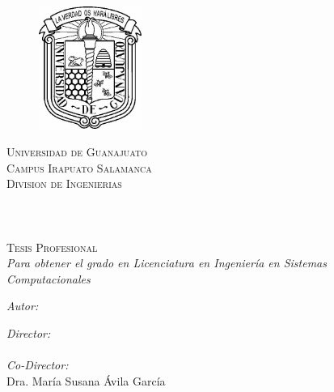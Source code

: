 \documentclass[11pt, oneside, a4paper]{Thesis} %
\begin{document}
\begin{titlepage}
\begin{center}

\begin{figure}[htbp]
	\centering
		\includegraphics[width=0.30\textwidth]{Figures/uni.jpg}
\end{figure}

\textsc{\LARGE Universidad de Guanajuato}\\[0.5cm] %
\textsc{\Large Campus Irapuato Salamanca }\\
\textsc{\Large Division de Ingenierias } \\[1.5cm]


\HRule \\[0.4cm] %
{\huge \bfseries \ttitle}\\[0.4cm] %
\HRule \\[1.1cm] %

\textsc{\Large Tesis Profesional }\\
\large \textit{Para obtener el grado en Licenciatura en Ingeniería en Sistemas Computacionales}\\[1.0cm] %


\begin{minipage}{0.4\textwidth}
\begin{flushleft} \large
\emph{Autor:}\\
{\authornames} %
\end{flushleft}
\end{minipage}
\begin{minipage}{0.4\textwidth}
\begin{flushright} \large
\emph{Director:} \\
{\supname}\\ %
\emph{Co-Director:}\\
{Dra. Mar\'ia Susana \'Avila Garc\'ia}
\end{flushright}
\end{minipage}\\[0.8cm]


\end{center}
\end{titlepage}
\end{document}

